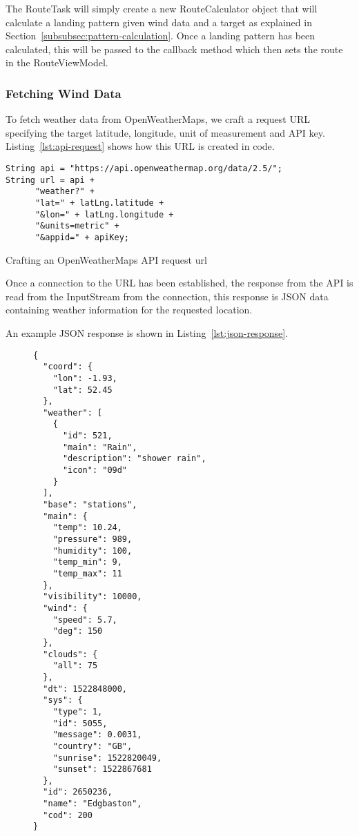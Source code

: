 The RouteTask will simply create a new RouteCalculator object that will calculate a landing pattern given wind data and a target as explained in Section~\vref{subsubsec:pattern-calculation}. Once a landing pattern has been calculated, this will be passed to the callback method which then sets the route in the RouteViewModel.

\subsubsection{Fetching Wind Data}\label{subsubsec:fetching-wind-data}
To fetch weather data from OpenWeatherMaps, we craft a request URL specifying the target latitude, longitude, unit of measurement and API key. Listing~\vref{lst:api-request} shows how this URL is created in code.

\begin{listing*}
  \centering
  \begin{verbatim}
String api = "https://api.openweathermap.org/data/2.5/";
String url = api +
      "weather?" +
      "lat=" + latLng.latitude +
      "&lon=" + latLng.longitude +
      "&units=metric" +
      "&appid=" + apiKey;
  \end{verbatim}
  \caption{Crafting an OpenWeatherMaps API request url}\label{lst:api-request}
\end{listing*}

Once a connection to the URL has been established, the response from the API is read from the InputStream from the connection, this response is JSON data containing weather information for the requested location.

An example JSON response is shown in Listing~\vref{lst:json-response}.

\begin{wrapfigure}{L}{0.5\linewidth}
  \begin{verbatim}
{
  "coord": {
    "lon": -1.93,
    "lat": 52.45
  },
  "weather": [
    {
      "id": 521,
      "main": "Rain",
      "description": "shower rain",
      "icon": "09d"
    }
  ],
  "base": "stations",
  "main": {
    "temp": 10.24,
    "pressure": 989,
    "humidity": 100,
    "temp_min": 9,
    "temp_max": 11
  },
  "visibility": 10000,
  "wind": {
    "speed": 5.7,
    "deg": 150
  },
  "clouds": {
    "all": 75
  },
  "dt": 1522848000,
  "sys": {
    "type": 1,
    "id": 5055,
    "message": 0.0031,
    "country": "GB",
    "sunrise": 1522820049,
    "sunset": 1522867681
  },
  "id": 2650236,
  "name": "Edgbaston",
  "cod": 200
}
  \end{verbatim}
  \label{lst:json-response}
\end{wrapfigure}

